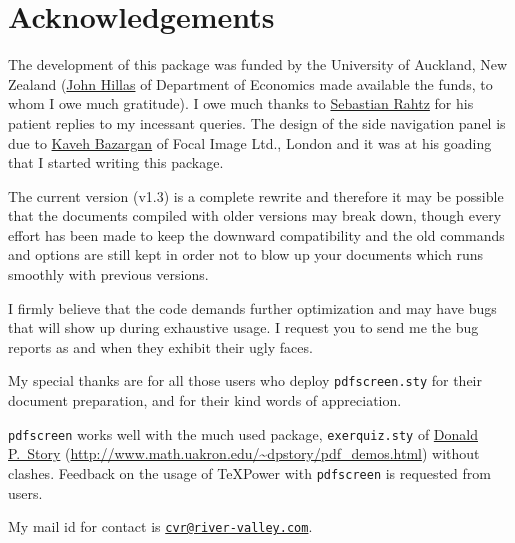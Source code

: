 \documentclass[a4paper]{article}
\def\pdfscreen{\texttt{\small\color{section1}pdfscreen}\xspace}
\begin{document}
\section{Acknowledgements}

The development of this package was funded by the University of
Auckland, New Zealand (\href{mailto:j.hillas@auckland.ac.nz}{John
Hillas} of Department of Economics made available the funds, to whom I
owe much gratitude). I owe much thanks to
\href{mailto:sebastian.rahtz@oucs.ac.uk}{Sebastian Rahtz} for his
patient replies to my incessant queries. The design of the side
navigation panel is due to \href{mailto:kaveh@focal.demon.co.uk}{Kaveh
Bazargan} of Focal Image Ltd., London and it was at his goading that I
started writing this package.

The current version (v1.3) is a complete rewrite and therefore
it may be possible that the documents compiled with older versions may
break down, though every effort has been made to keep the downward
compatibility and the old commands and options are still kept in order
not to blow up your documents which runs smoothly with previous
versions.

I firmly believe that the code demands further optimization and may
have bugs that will show up during exhaustive usage. I request you to
send me the bug reports as and when they exhibit their ugly faces.

My special thanks are for all those users who deploy
\verb+pdfscreen.sty+ for their document preparation, and for their kind
words of appreciation.

\pdfscreen works well with the much used package, \verb+exerquiz.sty+
of \href{mailto:dpstory@uakron.edu}{Donald P.~Story}
(\url{http://www.math.uakron.edu/~dpstory/pdf_demos.html}) without
clashes. Feedback on the usage of \TeX{}Power with \pdfscreen is
requested from users.

My mail id for contact is \href{mailto:cvr@river-valley.com}%
{\tt cvr@river-valley.com}.
\end{document}
